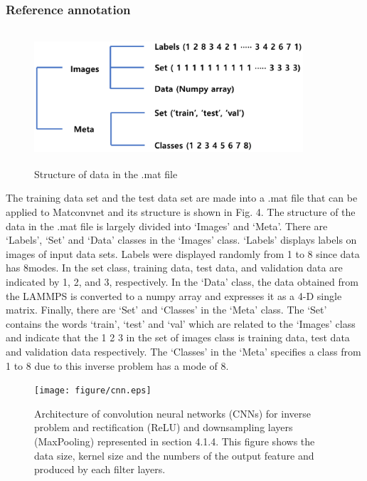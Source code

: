 \subsubsection{Reference annotation}
\label{subsubsec2}

\begin{figure}
\includegraphics[width=10cm, height=5cm]{figure/label.eps}
\caption{Structure of data in the .mat file}
\label{fig:4}       
\end{figure}
The training data set and the test data set are made into a .mat file that can be applied to Matconvnet and its structure is shown in Fig. 4. The structure of the data in the .mat file is largely divided into `Images' and `Meta'. There are `Labels', `Set' and `Data' classes in the `Images' class. `Labels' displays labels on images of input data sets. Labels were displayed randomly from 1 to 8 since data has 8modes. In the set class, training data, test data, and validation data are indicated by 1, 2, and 3, respectively. In the `Data' class, the data obtained from the LAMMPS is converted to a numpy array and expresses it as a 4-D single matrix. Finally, there are `Set' and `Classes' in the `Meta' class. The `Set' contains the words `train', `test' and `val' which are related to the `Images' class and indicate that the 1 2 3 in the set of images class is training data, test data and validation data respectively. The `Classes' in the `Meta' specifies a class from 1 to 8 due to this inverse problem has a mode of 8.
\begin{figure}
\texttt{[image: figure/cnn.eps]}
\caption{Architecture of convolution neural networks (CNNs) for inverse problem and rectification (ReLU) and downsampling layers (MaxPooling) represented in section 4.1.4. This figure shows the data size, kernel size and the numbers of the output feature and produced by each filter layers.}
\label{fig:5}       
\end{figure}

